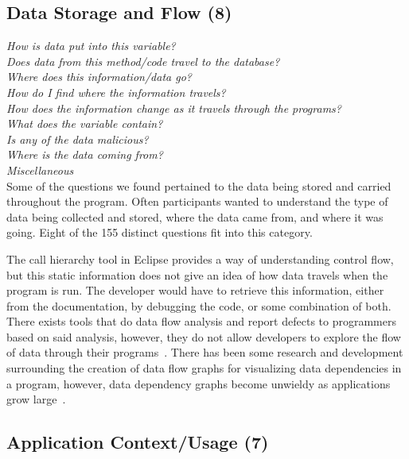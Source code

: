 \documentclass[conference]{IEEEtran}
\begin{document}

\noindent\subsection{\textbf{Data Storage and Flow (8)}}

\noindent\emph{How is data put into this variable?} \\
\emph{Does data from this method/code travel to the database?} \\
\emph{Where does this information/data go?} \\
\emph{How do I find where the information travels?} \\
\emph{How does the information change as it travels through the programs?} \\
\emph{What does the variable contain?} \\
\emph{Is any of the data malicious?} \\
\emph{Where is the data coming from?} \\
\emph{Miscellaneous} \\

Some of the questions we found pertained to the data being stored and carried throughout the program. 
Often participants wanted to understand  the type of data being collected and stored, where the data came from, and where it was going. 
Eight of the 155 distinct questions fit into this category.

The call hierarchy tool in Eclipse provides a way of understanding control flow, but this static information does not give an idea of how data travels when the program is run. 
The developer would have to retrieve this information, either from the documentation, by debugging the code, or some combination of both. 
There exists tools that do data flow analysis and report defects to programmers based on said analysis, however, they do not allow developers to explore the flow of data through their programs~\cite{jovanovic2006pixy}. 
There has been some research and development surrounding the creation of data flow graphs for visualizing data dependencies in a program, however, data dependency graphs become unwieldy as applications grow large~\cite{ghosh2001method, ferrante1987program}.



\noindent\subsection{\textbf{Application Context/Usage (7)}}
\end{document}
